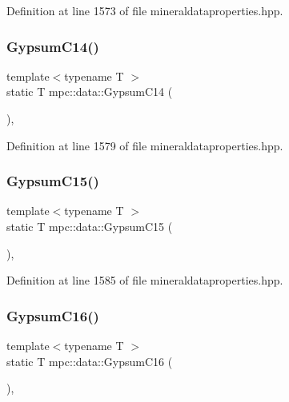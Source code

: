 Definition at line 1573 of file mineraldataproperties.\+hpp.

\mbox{\label{namespacempc_1_1data_a08ff2e149da17db5e2e7171b8ca684e5}} 
\subsubsection{\texorpdfstring{Gypsum\+C14()}{GypsumC14()}}
{\footnotesize\ttfamily template$<$typename T $>$ \\
static T mpc\+::data\+::\+Gypsum\+C14 (\begin{DoxyParamCaption}{ }\end{DoxyParamCaption})\hspace{0.3cm}{\ttfamily [inline]}, {\ttfamily [static]}}



Definition at line 1579 of file mineraldataproperties.\+hpp.

\mbox{\label{namespacempc_1_1data_a7ddcd74539a8b32dd2f7030a4efd1f07}} 
\subsubsection{\texorpdfstring{Gypsum\+C15()}{GypsumC15()}}
{\footnotesize\ttfamily template$<$typename T $>$ \\
static T mpc\+::data\+::\+Gypsum\+C15 (\begin{DoxyParamCaption}{ }\end{DoxyParamCaption})\hspace{0.3cm}{\ttfamily [inline]}, {\ttfamily [static]}}



Definition at line 1585 of file mineraldataproperties.\+hpp.

\mbox{\label{namespacempc_1_1data_a31a193f2ca43267dd16ce31fb10aed93}} 
\subsubsection{\texorpdfstring{Gypsum\+C16()}{GypsumC16()}}
{\footnotesize\ttfamily template$<$typename T $>$ \\
static T mpc\+::data\+::\+Gypsum\+C16 (\begin{DoxyParamCaption}{ }\end{DoxyParamCaption})\hspace{0.3cm}{\ttfamily [inline]}, {\ttfamily [static]}}



